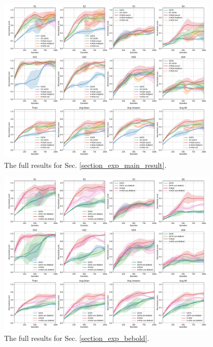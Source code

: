 \documentclass[11pt]{article}
\begin{document}
\begin{figure}[htb]
\centering
\includegraphics[width=0.95\textwidth]{exp1sup_main.pdf}
\caption{The full results for Sec. \ref{section_exp_main_result}. }
\label{exp1sup_main}
\end{figure}

\begin{figure}[htb]
\centering
\includegraphics[width=0.95\textwidth]{exp2sup_woBeBold.pdf}
\caption{The full results for Sec. \ref{section_exp_bebold}.}
\label{exp2sup_woBeBold}
\end{figure}
\end{document}

